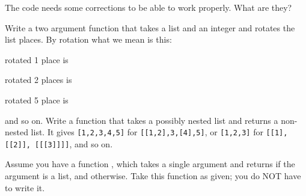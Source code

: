 \documentclass[11pt]{exam}
\begin{document}
\begin{questions}
\begin{parts}
The code needs some corrections to be able to work properly. What are they?

\begin{ucodeframe}
\end{ucodeframe}

\end{parts}
\newpage
{}
\vspace{10pt}
\question[30]
Write a two argument function  that takes a list  and an
integer  and rotates the list   places. By rotation what we mean
	is this:

\pyv{[1,2,3,4]} rotated 1 place is \pyv{[2,3,4,1]}

\pyv{[1,2,3,4]} rotated 2 places is \pyv{[3,4,1,2]}

\pyv{[1,2,3,4]} rotated 5 place is \pyv{[2,3,4,1]}

and so on.
\newpage
{}
\vspace{10pt}
\question[30]
Write a function that takes a possibly nested list and returns a non-nested list.
It gives \Verb+[1,2,3,4,5]+ for \Verb+[[1,2],3,[4],5]+, or \Verb+[1,2,3]+ for
\Verb+[[1],[[2]], [[[3]]]]+, and so on.   

Assume you have a function , which takes a single argument and returns  if the argument is a list, and  otherwise. Take this function as given; you do NOT have to write it.

\end{questions}
\end{document}
